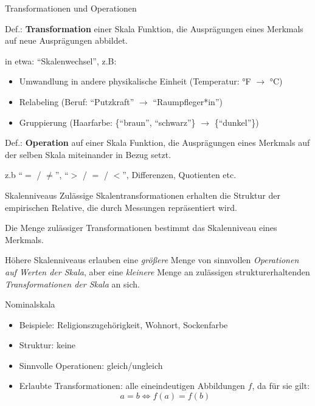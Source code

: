 \documentclass[
  10pt,
  ignorenonframetext,
]{beamer}
\providecommand{\tightlist}{%
  \setlength{\itemsep}{0pt}\setlength{\parskip}{0pt}}
\begin{document}
\begin{frame}{Transformationen und Operationen}
\label{transformationen-und-operationen}
\begin{block}{Def.: \textbf{Transformation} einer Skala}
\label{def.-transformation-einer-skala}
Funktion, die Ausprägungen eines Merkmals auf neue Ausprägungen
abbildet.
\end{block}

in etwa: ``Skalenwechsel'', z.B:

\begin{itemize}
\tightlist
\item
  Umwandlung in andere physikalische Einheit (Temperatur: °F \(\to\) °C)
\item
  Relabeling (Beruf: ``Putzkraft'' \(\to\) ``Raumpfleger*in'')
\item
  Gruppierung (Haarfarbe: \{``braun'', ``schwarz''\} \(\to\)
  \{``dunkel''\})
\end{itemize}

\begin{block}{Def.: \textbf{Operation} auf einer Skala}
\label{def.-operation-auf-einer-skala}
Funktion, die Ausprägungen eines Merkmals auf der selben Skala
miteinander in Bezug setzt.
\end{block}

z.b ``\(=\) / \(\neq\)'', ``\(>\) / \(=\) / \(<\)'', Differenzen,
Quotienten etc.
\end{frame}

\begin{frame}{Skalenniveaus}
\label{skalenniveaus-1}
Zulässige Skalentransformationen erhalten die Struktur der empirischen
Relative, die durch Messungen repräsentiert wird.

Die Menge zulässiger Transformationen bestimmt das Skalenniveau eines
Merkmals.

Höhere Skalenniveaus erlauben eine \emph{größere} Menge von sinnvollen
\emph{Operationen auf Werten der Skala}, aber eine \emph{kleinere} Menge
an zulässigen strukturerhaltenden \emph{Transformationen der Skala} an
sich.
\end{frame}

\begin{frame}{Nominalskala}
\label{nominalskala}
\begin{itemize}
\tightlist
\item
  Beispiele: Religionszugehörigkeit, Wohnort, Sockenfarbe
\item
  Struktur: keine
\item
  Sinnvolle Operationen: gleich/ungleich
\item
  Erlaubte Transformationen: alle eineindeutigen Abbildungen \(f\), da
  für sie gilt: \begin{equation*}
               a = b \iff f(a) = f(b)
           \end{equation*}
\end{itemize}
\end{frame}
\end{document}
